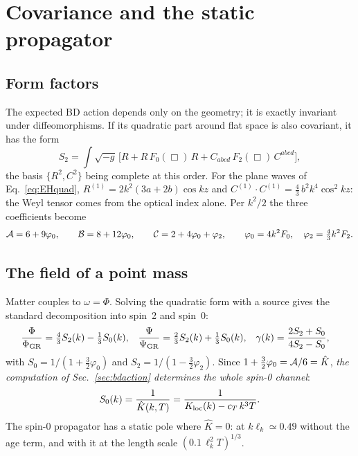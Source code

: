 \section{Covariance and the static propagator}\label{sec:propagator}

\subsection{Form factors}

The expected BD action depends only on the geometry; it is exactly invariant under diffeomorphisms. If its
quadratic part around flat space is also covariant, it has the form
\begin{equation}
  S_2=\int\sqrt{-g}\,\Big[R+R\,F_0(\Box)\,R+C_{abcd}\,F_2(\Box)\,C^{abcd}\Big],
\end{equation}
the basis $\{R^2,C^2\}$ being complete at this order. For the plane waves of Eq.~\eqref{eq:EHquad},
$R^{(1)}=2k^2(3a+2b)\cos kz$ and $C^{(1)}\!\cdot C^{(1)}=\tfrac43\,b^2k^4\cos^2kz$: the Weyl tensor comes from
the optical index alone. Per $k^2/2$ the three coefficients become
\begin{equation}
  \mathcal{A}=6+9\varphi_0,\qquad \mathcal{B}=8+12\varphi_0,\qquad \mathcal{C}=2+4\varphi_0+\varphi_2,\qquad
  \varphi_0=4k^2F_0,\quad \varphi_2=\tfrac43k^2F_2 .
\end{equation}

\subsection{The field of a point mass}

Matter couples to $\omega=\Phi$. Solving the quadratic form with a source gives the standard decomposition
into spin~2 and spin~0:
\begin{align}
  \frac{\Phi}{\Phi_{\rm GR}}&=\tfrac43S_2(k)-\tfrac13S_0(k), &
  \frac{\Psi}{\Psi_{\rm GR}}&=\tfrac23S_2(k)+\tfrac13S_0(k), &
  \gamma(k)&=\frac{2S_2+S_0}{4S_2-S_0},
\end{align}
with $S_0=1/(1+\tfrac32\varphi_0)$ and $S_2=1/(1-\tfrac32\varphi_2)$. Since $1+\tfrac32\varphi_0=\mathcal{A}/6=\hat K$,
\emph{the computation of Sec.~\ref{sec:bdaction} determines the whole spin-0 channel}:
\begin{equation}
  S_0(k)=\frac{1}{\hat K(k,T)}=\frac{1}{K_{\rm loc}(k)-c_T\,k^3T}.
\end{equation}
The spin-0 propagator has a static pole where $\hat K=0$: at $k\ell_k\simeq0.49$ without the age term, and
with it at the length scale $(0.1\,\ell_k^2T)^{1/3}$.

